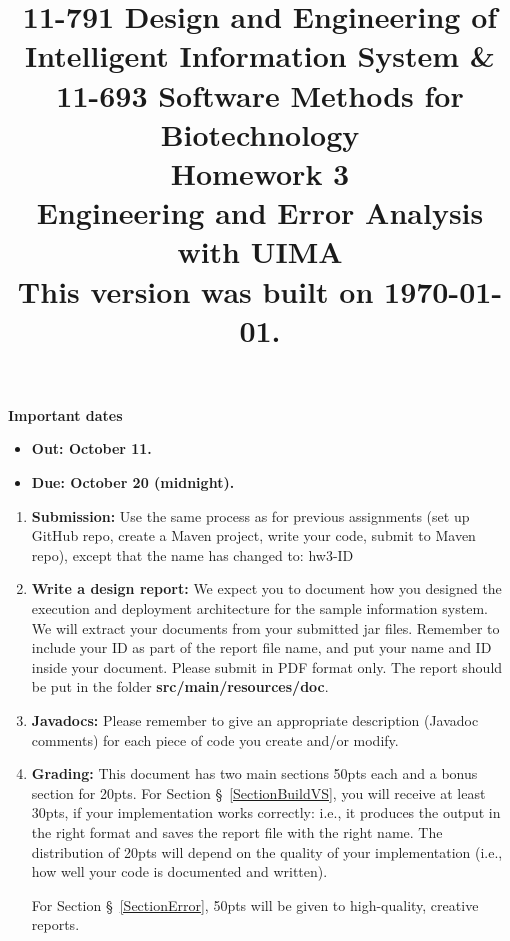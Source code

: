 \documentclass[oneside,11pt]{memoir}
\title{{\bfseries 11-791 Design and Engineering of Intelligent Information
System \& \\11-693 Software Methods for Biotechnology \\Homework 3}\\
\vspace{1em}
Engineering and Error Analysis with UIMA
\\
{\small This version was built on \today.}
}
\date{}
\begin{document}
\maketitle

\hspace{-0.1\textwidth}
\begin{minipage}{1.2\textwidth}
\vspace{-5em}
\textbf{Important dates}
\begin{itemize}

\item \textbf{Out: October 11.} 

\item \textbf{Due: October 20 (midnight).} 

\end{itemize}

\end{minipage}

\begin{enumerate}

\item \textbf{Submission:} 
Use the same process as for previous assignments (set up GitHub repo, create a Maven 
project, write your code, submit to Maven repo), except that the name has changed to:
hw3-ID

\item \textbf{Write a design report:}
We expect you to document how you designed the execution and
deployment architecture for the sample information system. 
We will extract your documents from your
submitted jar files. 
Remember to include your ID as part of the report file name, and put your name and
ID inside your document. Please submit in PDF format only.
The report should be put in the folder \textbf{src/main/resources/doc}.


\item \textbf{Javadocs:} 
Please remember to give an appropriate description (Javadoc comments) for each 
piece of code you create and/or modify.

\item \textbf{Grading:}
This document has two main sections 50pts each and a bonus section 
for 20pts.
For Section \S~\ref{SectionBuildVS}, you will receive at least 30pts,
if your implementation works correctly: i.e., it produces
the output in the right format and saves
the report file with the right name.
The distribution of 20pts will depend on the quality of your implementation
(i.e., how well your code is documented and written).

For Section \S~\ref{SectionError}, 50pts will be given
to high-quality, creative reports.


\end{enumerate}
\end{document}
